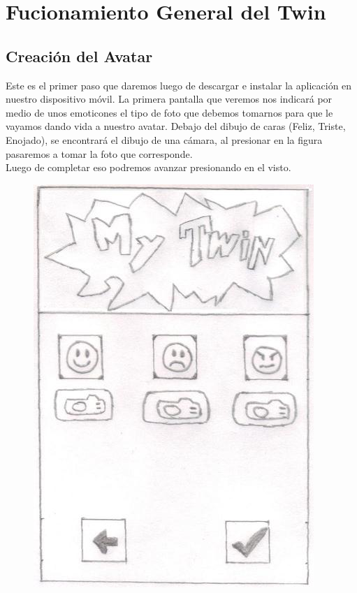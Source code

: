 \documentclass[12pt]{article}
\begin{document}
\newpage
\section{Fucionamiento General del Twin}

\subsection{Creaci\'on del Avatar}
Este es el primer paso que daremos luego de descargar e instalar la aplicaci\'on en nuestro dispositivo m\'ovil. La primera pantalla que veremos nos indicar\'a por medio de unos emoticones el tipo de foto que debemos tomarnos para que le vayamos dando vida a nuestro avatar. Debajo del dibujo de caras (Feliz, Triste, Enojado), se encontrar\'a el dibujo de una c\'amara, al presionar en la figura pasaremos a tomar la foto que corresponde.\\
Luego de completar eso podremos avanzar presionando en el visto. 

\begin{figure}[h]
\centering
\vspace{0.3in}\includegraphics[scale=0.5]{Twin1}
\end{figure}
\end{document}
